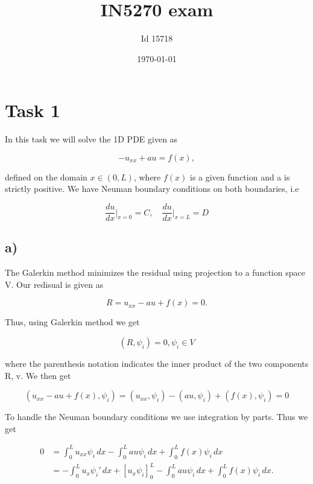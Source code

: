 \documentclass[norsk,a4paper,12pt]{scrartcl}
\begin{document}
\title{IN5270 exam}
\date{\today}

\author{Id 15718}
\maketitle

\section{Task 1}

In this task we will solve the 1D PDE given as 

\begin{equation}
    -u_{xx} + au = f(x),
\end{equation}

defined on the domain $x \in (0, L)$, where $f(x)$ is a given function and a is strictly positive. We have Neuman boundary conditions on both boundaries, i.e

\begin{equation*}
    \frac{du}{dx}\rvert_{x=0} = C, \quad \frac{du}{dx}\rvert_{x=L} = D
\end{equation*}

\subsection{a)}
The Galerkin method minimizes the residual using projection to a function space V. Our redisual is given as 

\begin{equation*}
    R = u_{xx} - au + f(x) = 0.
\end{equation*}

Thus, using Galerkin method we get

\begin{equation*}
    (R, \psi_i) = 0, \psi_i \in V
\end{equation*}

where the parenthesis notation indicates the inner product of the two components R, v. We then get 

\begin{equation*}
    (u_{xx} - au + f(x), \psi_i) = (u_{xx}, \psi_i) - (au, \psi_i) + (f(x), \psi_i) = 0
\end{equation*}

To handle the Neuman boundary conditions we use integration by parts. Thus we get 

\begin{equation*}
\begin{aligned}
     0 &= \int_0^L u_{xx}\psi_i\,dx - \int_0^L au \psi_i \,dx + \int_0^L f(x) \psi_i\, dx \\
     &= -\int_0^L u_x\psi_i'\,dx + [u_x\psi_i]_0^L - \int_0^L au \psi_i \,dx + \int_0^L f(x) \psi_i\, dx.
\end{aligned}
\end{equation*}
\end{document}
